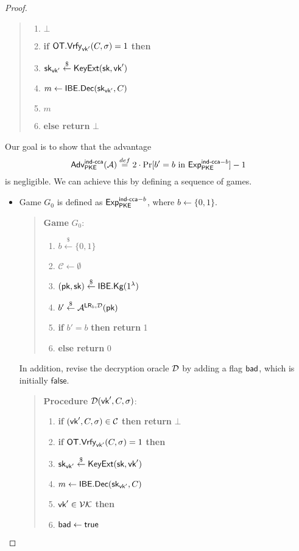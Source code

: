 \documentclass[12pt]{article}
\newcommand{\eqdef}{\stackrel{def}{=}}
\newcommand{\bits}{\{0,1\}}
\newcommand{\getsr}{\stackrel{\$}{\gets}}
\newcommand{\Adv}{\textsf{Adv}}
\newcommand{\tab}{\hspace{0.3in}}
\newcommand{\Vrfy}{\textsf{Vrfy}}
\newcommand{\true}{\textsf{true}}
\newcommand{\false}{\textsf{false}}
\newcommand{\C}{\mathcal{C}}
\theoremstyle{definition}
\newcommand{\PKE}{\textsf{PKE}}
\newcommand{\Kg}{\textsf{Kg}}
\newcommand{\Dec}{\textsf{Dec}}
\newcommand{\pk}{\textsf{pk}}
\newcommand{\sk}{\textsf{sk}}
\newcommand{\A}{\mathcal{A}}
\newcommand{\LR}{\textsf{LR}}
\begin{document}
\begin{proof}
\begin{quote}
\begin{minipage}[t]{0.4\textwidth}
\begin{enumerate}
\item \tab {\bf return} $\bot$
\item {\bf if} $\OT.\Vrfy_{\vk'}(C,\sigma)=1$ {\bf then}
\item \tab $\sk_{\vk'} \getsr \KeyExt(\sk, \vk')$
\item \tab $m \gets \IBE.\Dec(\sk_{\vk'}, C)$
\item \tab {\bf return} $m$
\item {\bf else return} $\bot$
\end{enumerate}
\end{minipage}
\end{quote}
Our goal is to show that the advantage
$$\Adv_{\PKE}^{\cca}(\A) \eqdef  2\cdot\Pr[\textrm{$b'=b$ in $\Exp_{\PKE}^{\cca-b}$}]-1 $$
is negligible. We can achieve this by defining a sequence of games.
\begin{itemize}
\item Game $G_0$ is defined as $\Exp_{\PKE}^{\cca-b}$, where $b \gets \bits$. 
\begin{quote}
{\bf Game} $G_0$:
\begin{enumerate}
\item $b \getsr \bits$
\item $\C \gets \emptyset$
\item $(\pk, \sk) \getsr \IBE.\Kg(1^\lambda)$
\item $b' \getsr \A^{\LR_b, \D}(\pk)$
\item {\bf if} $b' = b$ {\bf then return} 1
\item {\bf else return} 0
\end{enumerate}
\end{quote}
In addition, revise the decryption oracle $\mathcal{D}$ by adding a flag $\textsf{bad}$, which is initially $\false$.
\begin{quote}
{\bf Procedure} $\mathcal{D}(\textsf{vk}', C,\sigma)$:
\begin{enumerate}
\item {\bf if} $(\vk', C,\sigma) \in \C$ {\bf then return} $\bot$
\item {\bf if} $\OT.\Vrfy_{\vk'}(C,\sigma)=1$ {\bf then}
\item \tab $\sk_{\vk'} \getsr \KeyExt(\sk, \vk')$
\item \tab $m \gets \IBE.\Dec(\sk_{\vk'}, C)$
\item \tab {\bf if} $\textsf{vk}' \in \mathcal{VK}$ {\bf then}
\item \tab \tab \tab $\bad \gets \true$

\end{enumerate}
\end{quote}
\end{itemize}
\end{proof}
\end{document}
